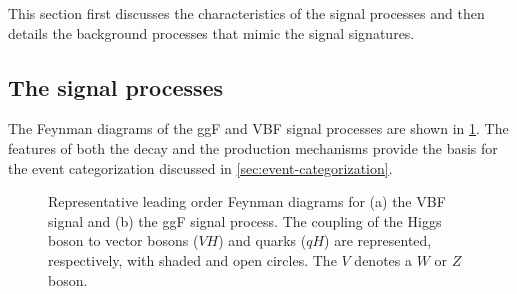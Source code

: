 This section first discusses the characteristics of the signal processes and then details the background processes that mimic the signal signatures.

\subsection{The signal processes}
\label{subsec:signal-bkg-characterisation}
The Feynman diagrams of the ggF and VBF signal processes are shown in \cref{fig:feyn:sig-wwprod}.
The features of both the \HWWdet decay and the production mechanisms provide the basis for the event categorization discussed in \cref{sec:event-categorization}. 

\begin{figure}[ht]
    \caption{Representative leading order Feynman diagrams for (a) the VBF signal and (b) the ggF signal process. The coupling of the Higgs boson to vector bosons ($VH$) and quarks ($qH$) are represented, respectively, with shaded and open circles. The $V$ denotes a $W$ or $Z$ boson.} 
    \label{fig:feyn:sig-wwprod}
\end{figure}


